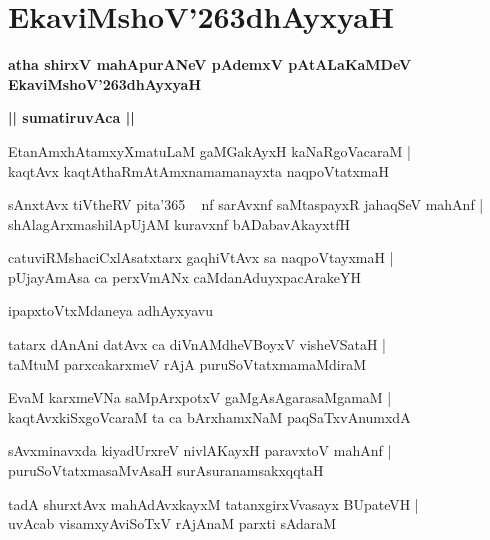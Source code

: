 \documentclass[twoside,12pt,openright]{book}
\def\S{\char'263}
\newcounter{shloka}[chapter]
\def\uvaca#1{\centerline{{\large\textbf{#1}}}}
\begin{document}
\chapter{EkaviMshoV\S dhAyxyaH}

\begin{center}
{\LARGE\bfseries atha shirxV mahApurANeV pAdemxV pAtALaKaMDeV EkaviMshoV\S dhAyxyaH}
\end{center}

\uvaca{|| sumatiruvAca ||}

\begin{shloka}%
EtanAmxhAtamxyXmatuLaM gaMGakAyxH kaNaRgoVacaraM |\\
kaqtAvx kaqtAthaRmAtAmxnamamanayxta naqpoVtatxmaH 
\end{shloka}

\begin{shloka}%
sAnxtAvx tiVtheRV pita\char'365 ~ nf sarAvxnf saMtaspayxR jahaqSeV mahAnf |\\
shAlagArxmashilApUjAM kuravxnf bADabavAkayxtfH 
\end{shloka}

\begin{shloka}%
catuviRMshaciCxlAsatxtarx gaqhiVtAvx sa naqpoVtayxmaH |\\
pUjayAmAsa ca perxVmANx caMdanAduyxpacArakeYH
\end{shloka}

\begin{center}
ipapxtoVtxMdaneya adhAyxyavu
\end{center}

\begin{shloka}%
tatarx dAnAni datAvx ca diVnAMdheVBoyxV visheVSataH |\\
taMtuM  parxcakarxmeV rAjA puruSoVtatxmamaMdiraM 
\end{shloka}

\begin{shloka}%
EvaM karxmeVNa saMpArxpotxV gaMgAsAgarasaMgamaM |\\
kaqtAvxkiSxgoVcaraM ta ca bArxhamxNaM paqSaTxvAnumxdA 
\end{shloka}

\begin{shloka}%
sAvxminavxda kiyadUrxreV nivlAKayxH paravxtoV mahAnf |\\
puruSoVtatxmasaMvAsaH surAsuranamsakxqqtaH 
\end{shloka}

\begin{shloka}%
tadA shurxtAvx mahAdAvxkayxM tatanxgirxVvasayx BUpateVH |\\
uvAcab visamxyAviSoTxV rAjAnaM parxti sAdaraM 
\end{shloka}
\end{document}
